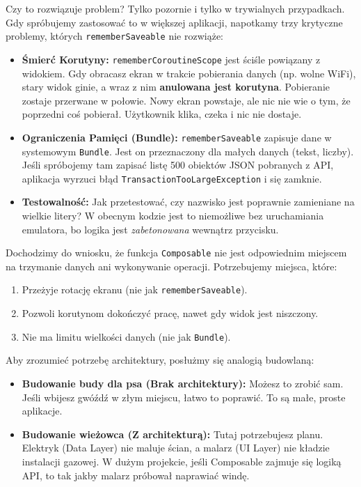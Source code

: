 Czy to rozwiązuje problem? Tylko pozornie i tylko w trywialnych przypadkach. Gdy spróbujemy zastosować to w większej aplikacji, napotkamy trzy krytyczne problemy, których \texttt{rememberSaveable} nie rozwiąże:

\begin{itemize}
    \item \textbf{Śmierć Korutyny:} \texttt{rememberCoroutineScope} jest ściśle powiązany z widokiem. Gdy obracasz ekran w trakcie pobierania danych (np. wolne WiFi), stary widok ginie, a wraz z nim \textbf{anulowana jest korutyna}. Pobieranie zostaje przerwane w połowie. Nowy ekran powstaje, ale nic nie wie o tym, że poprzedni coś pobierał. Użytkownik klika, czeka i nic nie dostaje.
    
    \item \textbf{Ograniczenia Pamięci (Bundle):} \texttt{rememberSaveable} zapisuje dane w systemowym \texttt{Bundle}. Jest on przeznaczony dla małych danych (tekst, liczby). Jeśli spróbojemy tam zapisać listę 500 obiektów JSON pobranych z API, aplikacja wyrzuci błąd \texttt{TransactionTooLargeException} i się zamknie.
    
    \item \textbf{Testowalność:} Jak przetestować, czy nazwisko jest poprawnie zamieniane na wielkie litery? W obecnym kodzie jest to niemożliwe bez uruchamiania emulatora, bo logika jest \textit{zabetonowana} wewnątrz przycisku.
\end{itemize}

Dochodzimy do wniosku, że funkcja \texttt{Composable} nie jest odpowiednim miejscem na trzymanie danych ani wykonywanie operacji. Potrzebujemy miejsca, które:
\begin{enumerate}
    \item Przeżyje rotację ekranu (nie jak \texttt{rememberSaveable}).
    \item Pozwoli korutynom dokończyć pracę, nawet gdy widok jest niszczony.
    \item Nie ma limitu wielkości danych (nie jak \texttt{Bundle}).
\end{enumerate}

Aby zrozumieć potrzebę architektury, posłużmy się analogią budowlaną:
\begin{itemize}
    \item \textbf{Budowanie budy dla psa (Brak architektury):} Możesz to zrobić sam. Jeśli wbijesz gwóźdź w złym miejscu, łatwo to poprawić. To są małe, proste aplikacje.
    \item \textbf{Budowanie wieżowca (Z architekturą):} Tutaj potrzebujesz planu. Elektryk (Data Layer) nie maluje ścian, a malarz (UI Layer) nie kładzie instalacji gazowej. W dużym projekcie, jeśli Composable zajmuje się logiką API, to tak jakby malarz próbował naprawiać windę.
\end{itemize}

